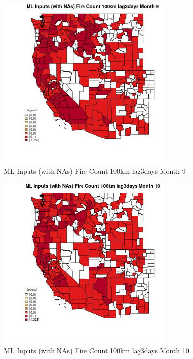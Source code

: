 \begin{figure} 
\centering  
\includegraphics[width=0.77\textwidth]{Code_Outputs/Report_ML_input_PM25_Step4_part_e_de_duplicated_aves_compiled_2019-05-21wNAs_CountyFire_Count_100km_lag3daysmedianMonth9.jpg} 
\caption{\label{fig:Report_ML_input_PM25_Step4_part_e_de_duplicated_aves_compiled_2019-05-21wNAsCountyFire_Count_100km_lag3daysmedianMonth9}ML Inputs (with NAs) Fire Count 100km lag3days Month 9} 
\end{figure} 
 

\begin{figure} 
\centering  
\includegraphics[width=0.77\textwidth]{Code_Outputs/Report_ML_input_PM25_Step4_part_e_de_duplicated_aves_compiled_2019-05-21wNAs_CountyFire_Count_100km_lag3daysmedianMonth10.jpg} 
\caption{\label{fig:Report_ML_input_PM25_Step4_part_e_de_duplicated_aves_compiled_2019-05-21wNAsCountyFire_Count_100km_lag3daysmedianMonth10}ML Inputs (with NAs) Fire Count 100km lag3days Month 10} 
\end{figure} 
 

